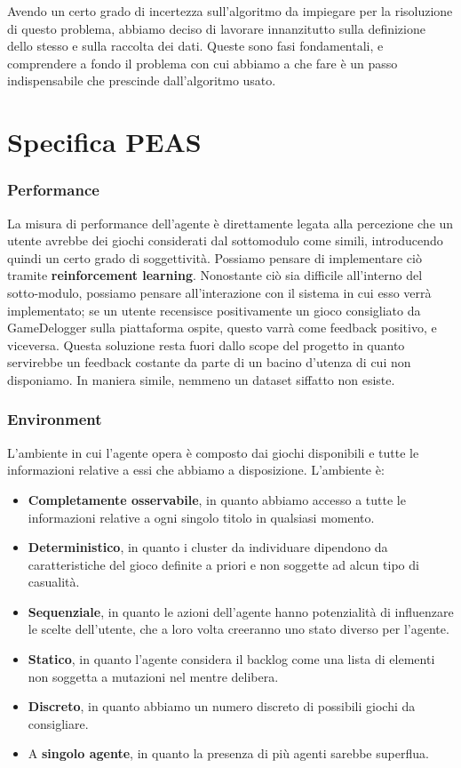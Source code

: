     Avendo un certo grado di incertezza sull'algoritmo da impiegare per la risoluzione di questo problema, abbiamo deciso di lavorare innanzitutto sulla definizione dello stesso e sulla raccolta dei dati. Queste sono fasi fondamentali, e comprendere a fondo il problema con cui abbiamo a che fare è un passo indispensabile che prescinde dall'algoritmo usato.

\section{Specifica PEAS}
    \subsubsection{Performance}
        La misura di performance dell'agente è direttamente legata alla percezione che un utente avrebbe dei giochi considerati dal sottomodulo come simili, introducendo quindi un certo grado di soggettività. Possiamo pensare di implementare ciò tramite \textbf{reinforcement learning}. Nonostante ciò sia difficile all'interno del sotto-modulo, possiamo pensare all'interazione con il sistema in cui esso verrà implementato; se un utente recensisce positivamente un gioco consigliato da GameDelogger sulla piattaforma ospite, questo varrà come feedback positivo, e viceversa. Questa soluzione resta fuori dallo scope del progetto in quanto servirebbe un feedback costante da parte di un bacino d'utenza di cui non disponiamo. In maniera simile, nemmeno un dataset siffatto non esiste.
        
    \subsubsection{Environment}
        L'ambiente in cui l'agente opera è composto dai giochi disponibili e tutte le informazioni relative a essi che abbiamo a disposizione. L'ambiente è:
        \begin{itemize}
            \item \textbf{Completamente osservabile}, in quanto abbiamo accesso a tutte le informazioni relative a ogni singolo titolo in qualsiasi momento.
            \item \textbf{Deterministico}, in quanto i cluster da individuare dipendono da caratteristiche del gioco definite a priori e non soggette ad alcun tipo di casualità.
            \item \textbf{Sequenziale}, in quanto le azioni dell'agente hanno potenzialità di influenzare le scelte dell'utente, che a loro volta creeranno uno stato diverso per l'agente.
            \item \textbf{Statico}, in quanto l'agente considera il backlog come una lista di elementi non soggetta a mutazioni nel mentre delibera.
            \item \textbf{Discreto}, in quanto abbiamo un numero discreto di possibili giochi da consigliare.
            \item A \textbf{singolo agente}, in quanto la presenza di più agenti sarebbe superflua.
        \end{itemize}
        
